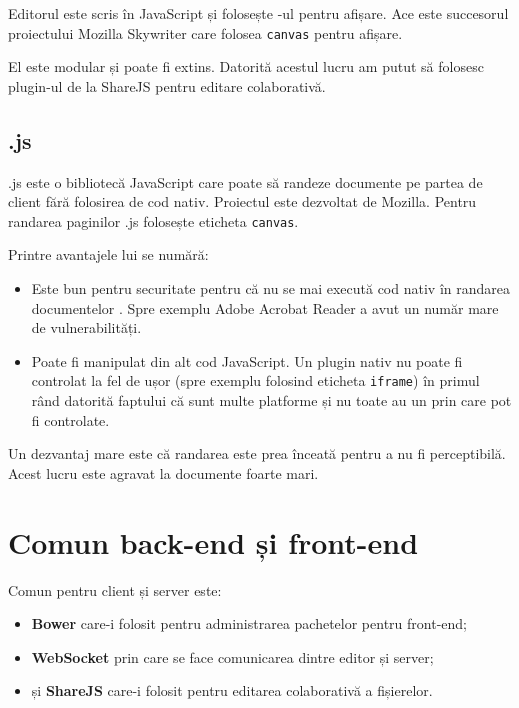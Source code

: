 \documentclass[a4wide,12pt]{report}
\newcommand{\eng}[1]{{#1}} %
\newcommand{\cod}[1]{\texttt{#1}}
\newcommand{\acr}[1]{{\textsmaller[1]{\textsc{#1}}}} %
\begin{document}
Editorul este scris în JavaScript și folosește \acr{DOM}-ul pentru afișare. Ace
este succesorul proiectului Mozilla Skywriter care folosea \cod{canvas} pentru
afișare.

El este modular și poate fi extins. Datorită acestul lucru am putut să folosesc
plugin-ul de la ShareJS pentru editare colaborativă.

\subsection{\acr{PDF}.js}

\acr{PDF}.js\cite{pdfjs} este o bibliotecă JavaScript care poate să randeze documente
\acr{PDF} pe partea de client fără folosirea de cod nativ. Proiectul este
dezvoltat de Mozilla. Pentru randarea paginilor \acr{PDF}.js folosește eticheta
\cod{canvas}.

Printre avantajele lui se numără:

\begin{itemize}

\item Este bun pentru securitate pentru că nu se mai execută cod nativ în
randarea documentelor \acr{PDF}. Spre exemplu Adobe Acrobat Reader a avut un
număr mare de vulnerabilități.

\item Poate fi manipulat din alt cod JavaScript. Un plugin nativ nu poate fi
controlat la fel de ușor (spre exemplu folosind eticheta \cod{iframe}) în primul
rând datorită faptului că sunt multe platforme și nu toate au un \acr{API} prin
care pot fi controlate.

\end{itemize}

Un dezvantaj mare este că randarea este prea înceată pentru a nu fi
perceptibilă. Acest lucru este agravat la documente foarte mari.

\section{Comun \eng{back-end} și \eng{front-end}}

Comun pentru client și server este:

\begin{itemize}

\item \textbf{Bower} care-i folosit pentru administrarea pachetelor pentru
\eng{front-end};

\item \textbf{WebSocket} prin care se face comunicarea dintre editor și server;

\item și \textbf{ShareJS} care-i folosit pentru editarea colaborativă a
fișierelor.

\end{itemize}
\end{document}
